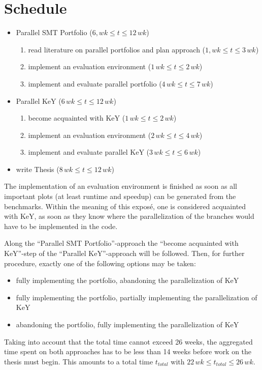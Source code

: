 \documentclass{scrartcl}
\begin{document}
\section{Schedule}
\begin{itemize}
    \item Parallel SMT Portfolio (\(6, wk \le t \le 12\, wk\))
    \begin{enumerate}
        \item read literature on parallel portfolios and plan approach
            (\(1, wk \le t \le 3\, wk\))
        \item implement an evaluation environment
            (\(1\, wk \le t \le 2\, wk\))
        \item implement and evaluate parallel portfolio
            (\(4\, wk \le t \le 7\, wk\))
    \end{enumerate}
    \item Parallel KeY (\(6\, wk \le t \le 12\, wk\))
    \begin{enumerate}
        \item become acquainted with KeY
            (\(1\, wk \le t \le 2\, wk\))
        \item implement an evaluation environment
            (\(2\, wk \le t \le 4\, wk\))
        \item implement and evaluate parallel KeY
            (\(3\, wk \le t \le 6\, wk\))
    \end{enumerate}
    \item write Thesis (\(8\, wk \le t \le 12\, wk\))
\end{itemize}

The implementation of an evaluation environment is finished as soon as
all important plots (at least runtime and speedup) can be generated from the benchmarks.
Within the meaning of this exposé, one is considered acquainted with KeY,
as soon as they know where the parallelization of the branches would have to be
implemented in the code.

Along the \enquote{Parallel SMT Portfolio}-approach the
\enquote{become acquainted with KeY}-step of the \enquote{Parallel KeY}-approach
will be followed.
Then, for further procedure, exactly one of the following options may be taken:
\begin{itemize}
    \item fully implementing the portfolio, abandoning the parallelization of KeY
    \item fully implementing the portfolio, partially implementing the parallelization of KeY
    \item abandoning the portfolio, fully implementing the parallelization of KeY
\end{itemize}

Taking into account that the total time cannot exceed 26 weeks,
the aggregated time spent on both approaches has to be less than 14 weeks
before work on the thesis must begin.
This amounts to a total time \(t_{total}\) with \(22\, wk \le t_{total} \le 26\, wk\).
\printbibliography
\end{document}
